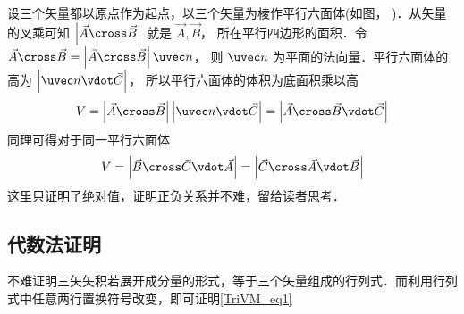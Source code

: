 设三个矢量都以原点作为起点，以三个矢量为棱作平行六面体(如图，%
)．从矢量的叉乘可知 $\left| {\vec A \cross \vec B} \right|$ 就是 $\vec A,\vec B$，  所在平行四边形的面积．令 $\vec A \cross \vec B = \left| {\vec A \cross \vec B} \right|\uvec n$， 则 $\uvec n$ 为平面的法向量．平行六面体的高为 $\left| {\uvec n \vdot \vec C} \right|$， 所以平行六面体的体积为底面积乘以高
\begin{equation}
V = \left| {\vec A \cross \vec B} \right|\left| {\uvec n \vdot \vec C} \right| = \left| {\vec A \cross \vec B \vdot \vec C} \right| 
\end{equation} 
同理可得对于同一平行六面体
\begin{equation}
V = \left| {\vec B \cross \vec C \vdot \vec A} \right| = \left| {\vec C \cross \vec A \vdot \vec B} \right| 
\end{equation}  
这里只证明了绝对值，证明正负关系并不难，留给读者思考．


\subsection{代数法证明}
不难证明三矢矢积若展开成分量的形式，等于三个矢量组成的行列式．而利用行列式中任意两行置换符号改变，即可证明\autoref{TriVM_eq1}


